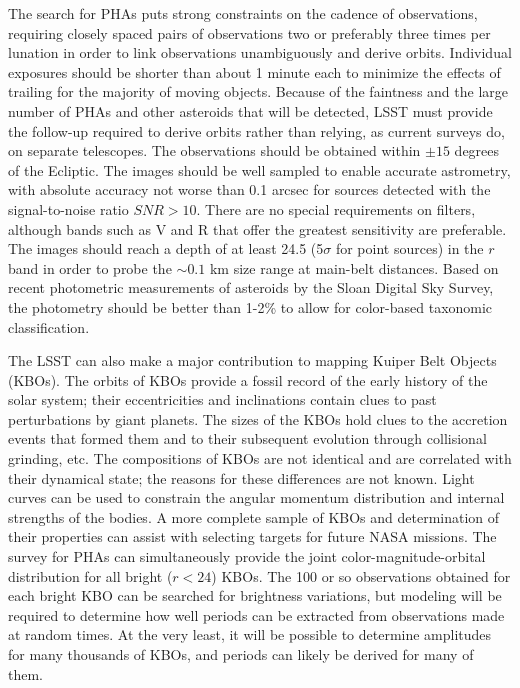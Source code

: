 The search for PHAs puts strong constraints on the cadence of observations,
requiring closely spaced pairs of observations two or preferably three
times per lunation in order to link observations unambiguously and derive
orbits. Individual exposures should be shorter than about 1 minute each to
minimize the effects of trailing for the majority of moving
objects. Because of the faintness and the large number of PHAs and other
asteroids that will be detected, LSST must provide the follow-up required
to derive orbits rather than relying, as current surveys do, on separate
telescopes. The observations should be obtained within $\pm15$ degrees of
the Ecliptic.  The images should be well sampled to enable accurate
astrometry, with absolute accuracy not worse than 0.1 arcsec for sources
detected with the signal-to-noise ratio $SNR>10$. There are no
special requirements on filters, although bands such as V and R that offer
the greatest sensitivity are preferable.  The images should reach a depth
of at least 24.5 (5$\sigma$ for point sources) in the $r$ band in order to
probe the $\sim0.1$ km size range at main-belt distances. Based on recent
photometric measurements of asteroids by the Sloan Digital Sky Survey, the
photometry should be better than 1-2\% to allow for color-based taxonomic
classification.

The LSST can also make a major contribution to mapping Kuiper Belt Objects
(KBOs).  The orbits of KBOs provide a fossil record of the early history of
the solar system; their eccentricities and inclinations contain clues to
past perturbations by giant planets. The sizes of the KBOs hold clues to
the accretion events that formed them and to their subsequent evolution
through collisional grinding, etc. The compositions of KBOs are not
identical and are correlated with their dynamical state; the reasons for
these differences are not known. Light curves can be used to constrain the
angular momentum distribution and internal strengths of the bodies. A more
complete sample of KBOs and determination of their properties can assist
with selecting targets for future NASA missions. The survey for PHAs can
simultaneously provide the joint color-magnitude-orbital distribution for
all bright ($r<24$) KBOs. The 100 or so observations obtained for each
bright KBO can be searched for brightness variations, but modeling will be
required to determine how well periods can be extracted from observations
made at random times. At the very least, it will be possible to determine
amplitudes for many thousands of KBOs, and periods can likely be derived
for many of them.

